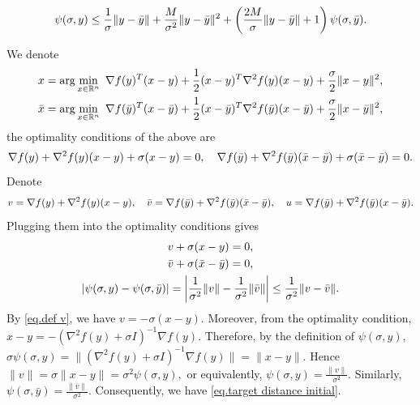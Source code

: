 \documentclass[moor,sglanonrev]{informs4}
\begin{document}
\begin{APPENDICES}
\begin{lemma}
        \begin{equation}
            \label{eq.psi property wrt y advanced}
            \psi(\sigma,y) \leq \frac{1}{\sigma}\|y-\Bar{y}\| +\frac{M}{\sigma^2}\|y-\Bar{y}\|^2 +\left(\frac{2M}{\sigma}\|y-\Bar{y}\|+1\right)\psi(\sigma,\Bar{y}).
        \end{equation}
    \end{lemma}
    We denote
    \begin{gather*}
        x = \arg\min_{x\in \mathbb{R}^n} \ \nabla f(y)^T(x-y) +\frac{1}{2}(x-y)^T\nabla ^2 f(y)(x-y) +\frac{\sigma}{2}\|x-y\|^2,\\
        \Bar{x} = \arg\min_{x\in \mathbb{R}^n} \ \nabla f(\Bar{y})^T(x-\Bar{y}) +\frac{1}{2}(x-\Bar{y})^T\nabla ^2 f(\Bar{y})(x-\Bar{y}) +\frac{\sigma}{2}\|x-\Bar{y}\|^2,
    \end{gather*}
    the optimality conditions of the above are
    \begin{equation*}
        \nabla f(y) + \nabla ^2 f(y)(x-y) +\sigma(x-y)=0,\quad
        \nabla f(\Bar{y})+\nabla ^2 f(\Bar{y})(\Bar{x}-\Bar{y})+\sigma(\Bar{x}-\Bar{y})=0.
    \end{equation*}
    Denote
    \begin{equation*}
        v = \nabla f(y) + \nabla ^2 f(y)(x-y),\quad
        \Bar{v} =  \nabla f(\Bar{y})+\nabla ^2 f(\Bar{y})(\Bar{x}-\Bar{y}),\quad
        u = \nabla f(\Bar{y})+\nabla ^2 f(\Bar{y})(x-\Bar{y}).
    \end{equation*}
    Plugging them into the optimality conditions gives
    \begin{gather}
        \label{eq.def v}
        v+\sigma(x-y)=0,\\
        \label{eq.def bar v}
        \Bar{v}+\sigma(\Bar{x}-\Bar{y})=0,\\
        \label{eq.target distance initial}
        \left \vert \psi(\sigma,y)-\psi(\sigma,\Bar{y}) \right\vert= \left \vert\frac{1}{\sigma^2}\|v\| -\frac{1}{\sigma^2}\|\Bar{v}\|\right\vert\leq \frac{1}{\sigma^2}\|v-\Bar{v}\|.
    \end{gather}
    {\color{red} By \eqref{eq.def v}, we have
    \(
    v=-\sigma(x-y).
    \)
    Moreover, from the optimality condition,
    \(
    x-y=-(\nabla^2 f(y)+\sigma I)^{-1}\nabla f(y).
    \)
    Therefore, by the definition of \(\psi(\sigma,y)\),
    \(
    \sigma\psi(\sigma,y)
    =
    \|(\nabla^2 f(y)+\sigma I)^{-1}\nabla f(y)\|
    =
    \|x-y\|.
    \)
    Hence
    \(
    \|v\|
    =
    \sigma\|x-y\|
    =
    \sigma^2\psi(\sigma,y),
    \)
    or equivalently,
    \(
    \psi(\sigma,y)=\frac{\|v\|}{\sigma^2}.
    \)
    Similarly, \(\psi(\sigma,\bar y)=\frac{\|\bar v\|}{\sigma^2}. \)
    Consequently, we have \eqref{eq.target distance initial}.}


\end{APPENDICES}
\end{document}
